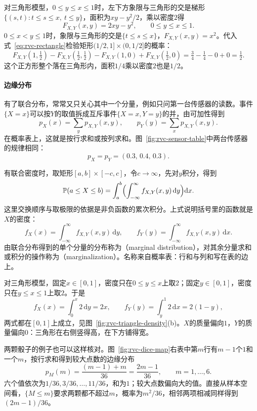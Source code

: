 对三角形模型，$0\leq y\leq x\leq 1$时，左下方象限与三角形的交是梯形$\{(s,t):t\leq s\leq x,\ t\leq y\}$，面积为$xy-y^{2}/2$，乘以密度$2$得
\[
 F_{X,Y}(x,y)=2xy-y^{2},\qquad 0\leq y\leq x\leq 1 .
\]
$0\leq x<y\leq 1$时，象限与三角形的交是$\{t\leq s\leq x\}$，$F_{X,Y}(x,y)=x^{2}$。代入式~\eqref{eq:rvc-rectangle}检验矩形$(1/2,1]\times(0,1/2]$的概率：
\[
 F_{X,Y}(1,\tfrac12)-F_{X,Y}(\tfrac12,\tfrac12)-F_{X,Y}(1,0)+F_{X,Y}(\tfrac12,0)
 =\tfrac34-\tfrac14-0+0=\tfrac12 .
\]
这个正方形整个落在三角形内，面积$1/4$乘以密度$2$也是$1/2$。

\paragraph{边缘分布}
有了联合分布，常常又只关心其中一个分量，例如只问第一台传感器的读数。事件$\{X=x\}$可以按$Y$的取值拆成互斥事件$\{X=x,Y=y\}$的并，由可加性得到
\begin{equation}
 p_X(x)=\sum_{y}p_{X,Y}(x,y),\qquad p_Y(y)=\sum_{x}p_{X,Y}(x,y).
 \label{eq:rvc-marginal-pmf}
\end{equation}
在概率表上，这就是按行求和或按列求和。图~\ref{fig:rvc-sensor-table}中两台传感器的规律相同：
\[
 p_X=p_Y=(0.3,\,0.4,\,0.3).
\]

有联合密度时，取矩形$[a,b]\times[-c,c]$，令$c\to\infty$，先对$y$积分，得到
\[
 \mathbb{P}(a\leq X\leq b)=\int_{a}^{b}\Bigl(\int_{-\infty}^{\infty}f_{X,Y}(x,y)\,\mathrm{d}y\Bigr)\mathrm{d}x .
\]
这里交换顺序与取极限的依据是非负函数的累次积分。上式说明括号里的函数就是$X$的密度：
\begin{equation}
 f_X(x)=\int_{-\infty}^{\infty}f_{X,Y}(x,y)\,\mathrm{d}y,\qquad f_Y(y)=\int_{-\infty}^{\infty}f_{X,Y}(x,y)\,\mathrm{d}x.
 \label{eq:rvc-marginal-density}
\end{equation}
由联合分布得到的单个分量的分布称为（marginal distribution），对其余分量求和或积分的操作称为（marginalization）。名称来自概率表：行和与列和写在表的边上。

对三角形模型，固定$x\in[0,1]$，密度只在$0\leq y\leq x$上取$2$；固定$y\in[0,1]$，密度只在$y\leq x\leq 1$上取$2$。于是
\[
 f_X(x)=\int_{0}^{x}2\,\mathrm{d}y=2x,\qquad f_Y(y)=\int_{y}^{1}2\,\mathrm{d}x=2(1-y),
\]
两式都在$[0,1]$上成立，见图~\ref{fig:rvc-triangle-density}(b)。$X$的质量偏向$1$，$Y$的质量偏向$0$：三角形在右侧竖得高，在下方铺得宽。

两颗骰子的例子也可以这样核对。图~\ref{fig:rvc-dice-map}右表中第$m$行有$m-1$个$1$和一个$m$，按行求和得到较大点数的边缘分布
\[
 p_M(m)=\frac{(m-1)+m}{36}=\frac{2m-1}{36},\qquad m=1,\dots,6 .
\]
六个值依次为$1/36,3/36,\dots,11/36$，和为$1$；较大点数偏向大的值。直接从样本空间看，$\{M\leq m\}$要求两颗都不超过$m$，概率为$m^{2}/36$，相邻两项相减同样得到$(2m-1)/36$。

